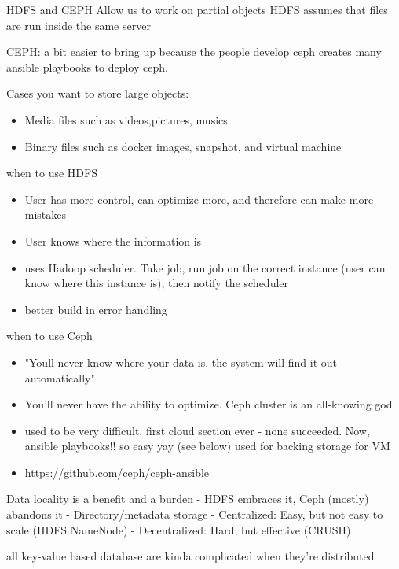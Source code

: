 \documentclass[fancy,11pt,titlestyle=display]{style/elegantbook}
\begin{document}
HDFS and CEPH Allow us to work on partial objects
HDFS assumes that files are run inside the same server

CEPH: a bit easier to bring up because the people develop ceph creates many ansible playbooks to deploy ceph.

Cases you want to store large objects:\\
\begin{itemize}
    \item Media files such as videos,pictures, musics\\

    \item Binary files such as docker images, snapshot, and virtual machine

\end{itemize}


when to use HDFS
\begin{itemize}
    \item User has more control, can optimize more, and therefore can make more mistakes
    \item User knows where the information is
    \item uses Hadoop scheduler. Take job, run job on the correct instance (user can know where this instance is), then notify the scheduler
    \item better build in error handling
\end{itemize}

when to use Ceph
\begin{itemize}
    \item "Youll never know where your data is. the system will find it out automatically"
    \item You'll never have the ability to optimize. Ceph cluster is an all-knowing god
    \item used to be very difficult. first cloud section ever - none succeeded. Now, ansible playbooks!! so easy yay (see below)
    \itme used for backing storage for VM
    \item https://github.com/ceph/ceph-ansible
\end{itemize}


Data locality is a benefit and a burden
- HDFS embraces it, Ceph (mostly) abandons it
- Directory/metadata storage
- Centralized: Easy, but not easy to scale (HDFS NameNode)
- Decentralized: Hard, but effective (CRUSH)

all key-value based database are kinda complicated when they're distributed
\end{document}
